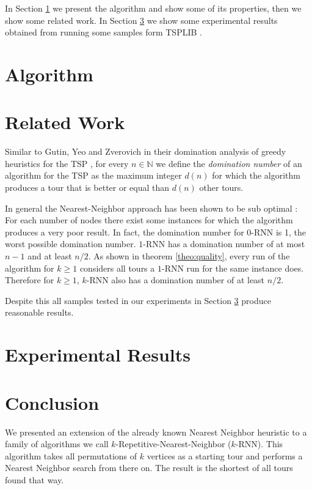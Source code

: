 \documentclass[11pt]{article}
\begin{document}
	In Section \ref{sec:algorithm} we present the algorithm and show some of its properties, then we show some related work. 
	In Section \ref{sec:experimental} we show some experimental results obtained from running some samples form TSPLIB \cite{REINELT1995}.
	
	\section{Algorithm}
	\label{sec:algorithm}
	
	
	\section{Related Work}
	\label{sec:related}
	
	Similar to Gutin, Yeo and Zverovich in their domination analysis of greedy heuristics for the TSP \cite{GUTIN2002}, for every $n \in \mathbb{N}$ we define the \textit{domination number} of an algorithm for the TSP as the maximum integer $d(n)$ for which the algorithm produces a tour that is better or equal than $d(n)$ other tours.
	 
	
	In general the Nearest-Neighbor approach has been shown to be sub optimal \cite{GUTIN2002}: 
	For each number of nodes there exist some instances for which the algorithm produces a very poor result.
	In fact, the domination number for $0$-RNN is 1, the worst possible domination number.
	$1$-RNN has a domination number of at most $n - 1$ and at least $n / 2$.
	As shown in theorem \ref{theo:quality}, every run of the algorithm for $k \geq 1$ considers all tours a $1$-RNN run for the same instance does.
	Therefore for $k \geq 1$, $k$-RNN also has a domination number of at least $n / 2$.
	
	Despite this all samples tested in our experiments in Section \ref{sec:experimental} produce reasonable results.
	\section{Experimental Results}
	\label{sec:experimental}
	
	

	
	\section{Conclusion}
	\label{sec:conclusion}
	
	We presented an extension of the already known Nearest Neighbor heuristic to a family of algorithms we call $k$-Repetitive-Nearest-Neighbor ($k$-RNN). 
	This algorithm takes all permutations of $k$ vertices as a starting tour and performs a Nearest Neighbor search from there on. 
	The result is the shortest of all tours found that way.
	
\end{document}
